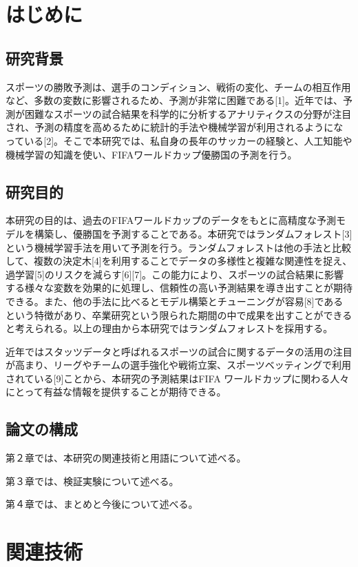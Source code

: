 \documentclass[platex]{suribt}
\begin{document}
\setcounter{tocdepth}{2}
\tableofcontents%
\mainmatter%
\chapter{はじめに}
\section{研究背景}
スポーツの勝敗予測は、選手のコンディション、戦術の変化、チームの相互作用など、多数の変数に影響されるため、予測が非常に困難である[1]。近年では、予測が困難なスポーツの試合結果を科学的に分析するアナリティクスの分野が注目され、予測の精度を高めるために統計的手法や機械学習が利用されるようになっている[2]。そこで本研究では、私自身の長年のサッカーの経験と、人工知能や機械学習の知識を使い、FIFAワールドカップ優勝国の予測を行う。
\section{研究目的}
本研究の目的は、過去のFIFAワールドカップのデータをもとに高精度な予測モデルを構築し、優勝国を予測することである。本研究ではランダムフォレスト[3]という機械学習手法を用いて予測を行う。ランダムフォレストは他の手法と比較して、複数の決定木[4]を利用することでデータの多様性と複雑な関連性を捉え、過学習[5]のリスクを減らす[6][7]。この能力により、スポーツの試合結果に影響する様々な変数を効果的に処理し、信頼性の高い予測結果を導き出すことが期待できる。また、他の手法に比べるとモデル構築とチューニングが容易[8]であるという特徴があり、卒業研究という限られた期間の中で成果を出すことができると考えられる。以上の理由から本研究ではランダムフォレストを採用する。\par
近年ではスタッツデータと呼ばれるスポーツの試合に関するデータの活用の注目が高まり、リーグやチームの選手強化や戦術立案、スポーツベッティングで利用されている[9]ことから、本研究の予測結果はFIFA ワールドカップに関わる人々にとって有益な情報を提供することが期待できる。
\section{論文の構成}
第２章では、本研究の関連技術と用語について述べる。\par
第３章では、検証実験について述べる。\par
第４章では、まとめと今後について述べる。

\chapter{関連技術}
\end{document}
